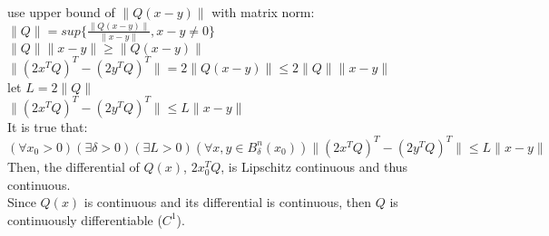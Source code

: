 \documentclass[12pt,letter]{article}
\begin{document}
\begin{itemize}
\begin{enumerate}
    use upper bound of $\|Q(x-y)\|$ with matrix norm:\\
    $\|Q\|=sup\{ \frac{\|Q(x-y)\|}{\|x-y\|}, x-y \neq 0\}$\\
    $\|Q\| \|x-y\| \geq \|Q(x-y)\|$\\
    $\|(2x^TQ)^T-(2y^TQ)^T\|=2\|Q(x-y)\| \leq 2 \|Q\| \|x-y\| $\\
    let $L=2\|Q\|$\\
    $\|(2x^TQ)^T-(2y^TQ)^T\| \leq L \|x-y\|$\\
    It is true that:\\
    $(\forall x_0>0)(\exists \delta>0)(\exists L>0)(\forall x,y \in B_{\delta}^n(x_0)) \|(2x^TQ)^T-(2y^TQ)^T \| \leq L \|x-y\|$\\
    Then, the differential of $Q(x)$, $2x_0^TQ$, is Lipschitz continuous and thus continuous.\\
    Since $Q(x)$ is continuous and its differential is continuous, then $Q$ is continuously differentiable ($C^1$).
  \end{enumerate}

\end{itemize}
\end{document}
